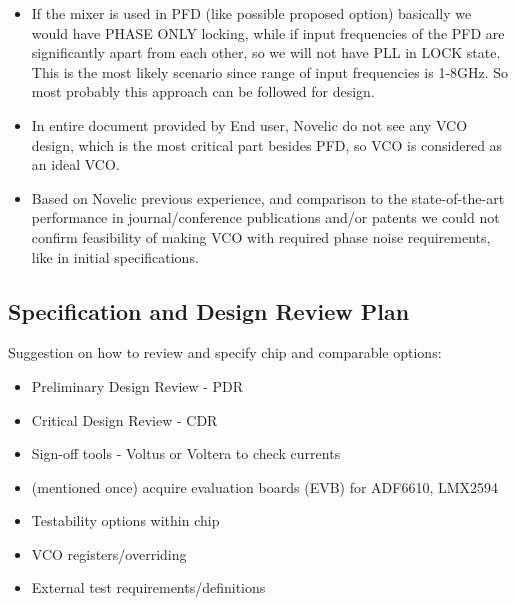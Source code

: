 \documentclass{article}
\begin{document}
\begin{itemize}
\begin{itemize}
		\item If the mixer is used in PFD (like possible proposed option) basically we would have PHASE ONLY locking, while if input frequencies of the PFD are significantly apart from each other, so we will not have PLL in LOCK state. This is the most likely scenario since range of input frequencies is 1-8GHz. So most probably this approach can be followed for design.
		\item In entire document provided by End user, Novelic do not see any VCO design, which is the most critical part besides PFD, so VCO is considered as an ideal VCO.  %
		\item Based on Novelic previous experience, and comparison to the state-of-the-art performance in journal/conference publications and/or patents we could not confirm feasibility of making VCO with required phase noise requirements, like in initial specifications. 
	\end{itemize}

\end{itemize}


\subsection{Specification and Design Review Plan} %

Suggestion on how to review and specify chip and comparable options:

\begin{itemize}
	\item Preliminary Design Review	- PDR
	\item Critical Design Review	- CDR
	\item Sign-off tools - Voltus or Voltera to check currents %
	\item (mentioned once) acquire evaluation boards (EVB) for ADF6610, LMX2594
	\item Testability options within chip
	\item VCO registers/overriding
	\item External test requirements/definitions
\end{itemize}
\end{document}
